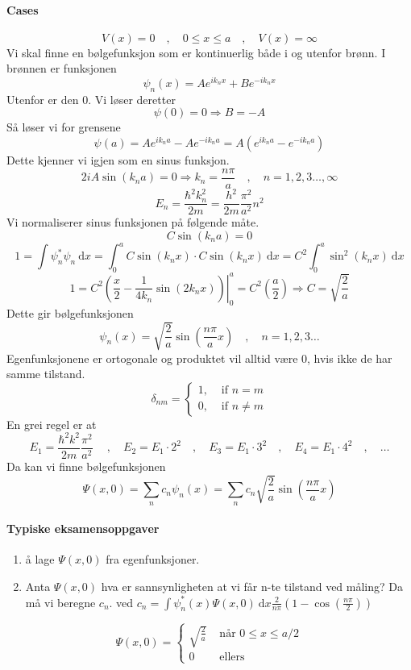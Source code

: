 \paragraph{Cases}
\[
V(x) = 0 \quad , \quad 0 \le x \le a \quad , \quad V(x) = ∞
\]
Vi skal finne en bølgefunksjon som er kontinuerlig både i og utenfor brønn. I brønnen er funksjonen 
\[
ψ_n(x) = A e^{i k_nx} + B e^{-i k_nx}
\]
Utenfor er den 0. Vi løser deretter 
\[
ψ(0) = 0 ⇒ B = -A
\]
Så løser vi for grensene 
\[
ψ(a) = A e^{i k_na} - A e^{-i k_na} = A \left(e^{i k_na} - e^{-i k_na}\right)
\]
Dette kjenner vi igjen som en sinus funksjon. 
\[
2iA\sin (k_na) = 0 ⇒ k_n = \frac{nπ}{a} \quad , \quad n = 1, 2, 3 \ldots , ∞
\]
\[
E_n = \frac{ℏ^2 k_n^2}{2m} = \frac{h^2}{2m} \frac{π^2}{a^2}n^2
\]
Vi normaliserer sinus funksjonen på følgende måte. 
\[
C \sin (k_na) = 0
\]
\[
1 = ∫ ψ_n^{*}ψ_n \ \mathrm{d}x = ∫_{0}^{a} C \sin (k_nx) ⋅ C \sin (k_nx) \ \mathrm{d}x = C^2 ∫_{0}^{a} \sin ^2 (k_n x) \ \mathrm{d}x
\]
\[
1 = C^2 \left.\left(\frac{x}{2} - \frac{1}{4 k_n} \sin (2 k_nx)\right)\right\rvert_{0}^{a} = C^2 \left(\frac{a}{2}\right) ⇒ C = \sqrt{\frac{2}{a}}
\]
Dette gir bølgefunksjonen
\[
ψ_n(x) = \sqrt{\frac{2}{a}} \sin \left(\frac{nπ}{a}x\right) \quad , \quad n = 1, 2, 3 \ldots 
\]
Egenfunksjonene er ortogonale og produktet vil alltid være 0, hvis ikke de har samme tilstand. 
\[
δ_{nm} = \begin{cases}
  1, &\text{ if }n = m\\
  0, &\text{ if }n ≠  m
\end{cases}
\]
En grei regel er at
\[
E_1 = \frac{ℏ^2 k^2}{2m} \frac{π^2}{a^2} \ \quad , \quad E_2 = E_1 ⋅ 2^2 \quad , \quad E_3 = E_1 ⋅ 3^2 \quad , \quad E_4 = E_1 ⋅ 4^2 \quad , \quad \ldots
\]
Da kan vi finne bølgefunksjonen
\[
Ψ(x,0) = ∑_{n}^{} c_n ψ_n(x) = ∑_{n}^{} c_n \sqrt{\frac{2}{a}} \sin \left(\frac{nπ}{a}x\right)
\]
\paragraph{Typiske eksamensoppgaver}
\begin{enumerate}
    \item å lage $Ψ(x,0)$ fra egenfunksjoner. 
    \item Anta $Ψ(x,0)$ hva er sannsynligheten at vi får n-te tilstand ved måling? Da må vi beregne $c_n$. ved $\displaystyle c_n = ∫ ψ_n^{*}(x) Ψ(x,0) \ \mathrm{d}x \frac{2}{nπ} \left(1 - \cos \left(\frac{nπ}{2}\right)\right)$
\end{enumerate}

\[
Ψ(x,0) = 
\begin{cases}
    \sqrt{\frac{2}{a}} &\text{ når } 0 \le x \le a / 2 \\
    0              & \text{ ellers } 
\end{cases}
\]

